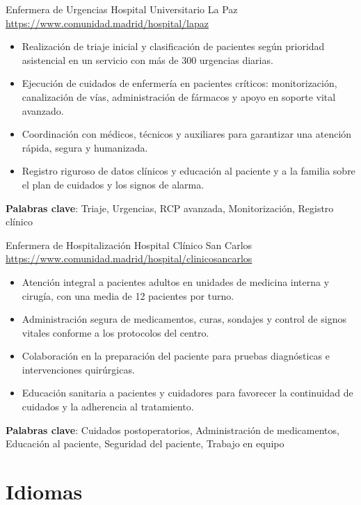 \documentclass[a4paper, serif, 10pt]{moderncv}
\begin{document}
        {Enfermera de Urgencias}
        {Hospital Universitario La Paz}
        {\url{https://www.comunidad.madrid/hospital/lapaz}}
        {}
        {\begin{itemize}
\item Realización de triaje inicial y clasificación de pacientes según prioridad asistencial en un servicio con más de 300 urgencias diarias.
\item Ejecución de cuidados de enfermería en pacientes críticos: monitorización, canalización de vías, administración de fármacos y apoyo en soporte vital avanzado.
\item Coordinación con médicos, técnicos y auxiliares para garantizar una atención rápida, segura y humanizada.
\item Registro riguroso de datos clínicos y educación al paciente y a la familia sobre el plan de cuidados y los signos de alarma.
\end{itemize}
\textbf{Palabras clave}: Triaje, Urgencias, RCP avanzada, Monitorización, Registro clínico}

        {Enfermera de Hospitalización}
        {Hospital Clínico San Carlos}
        {\url{https://www.comunidad.madrid/hospital/clinicosancarlos}}
        {}
        {\begin{itemize}
\item Atención integral a pacientes adultos en unidades de medicina interna y cirugía, con una media de 12 pacientes por turno.
\item Administración segura de medicamentos, curas, sondajes y control de signos vitales conforme a los protocolos del centro.
\item Colaboración en la preparación del paciente para pruebas diagnósticas e intervenciones quirúrgicas.
\item Educación sanitaria a pacientes y cuidadores para favorecer la continuidad de cuidados y la adherencia al tratamiento.
\end{itemize}
\textbf{Palabras clave}: Cuidados postoperatorios, Administración de medicamentos, Educación al paciente, Seguridad del paciente, Trabajo en equipo}
\section{Idiomas}

\end{document}
